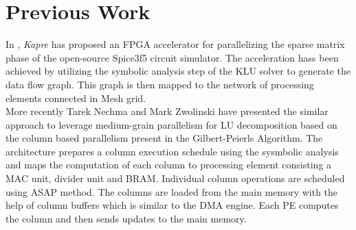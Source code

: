 \section{Previous Work}
In \cite{Kapre}, \textit{Kapre} has proposed an FPGA accelerator for parallelizing
the sparse matrix phase of the open-source Spice3f5 circuit simulator. The acceleration
hass been achieved by utilizing the symbolic analysis step of the KLU solver to generate
the data flow graph. This graph is then mapped to the network of processing elements 
connected in Mesh grid. \\
More recently Tarek Nechma and Mark Zwolinski \cite{Nechma} have presented the similar approach to 
leverage medium-grain parallelism for LU decomposition based on the column
based parallelism present in the Gilbert-Peierls Algorithm. The architecture 
prepares a column execution schedule using the sysmbolic analysis and maps the
computation of each column to processing element consisting a MAC unit, divider unit
and BRAM. Individual column operations are scheduled using ASAP method. The columns 
are loaded from the main memory with the help of column buffers which is similar to
the DMA engine. Each PE computes the column and then sends updates to the main memory.\\
